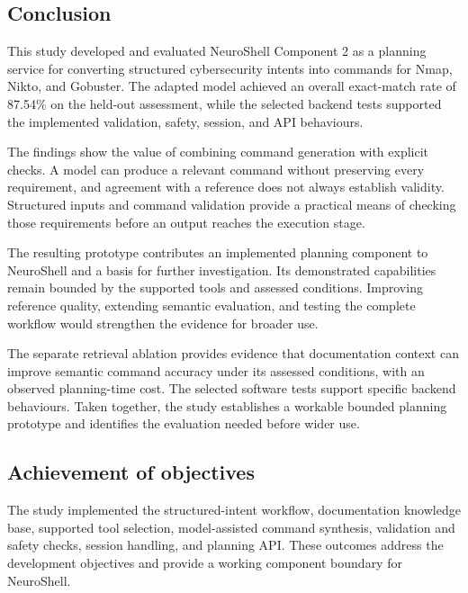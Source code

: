 \documentclass[
]{article}
\begin{document}
\hypertarget{conclusion}{%
\subsection{\texorpdfstring{
Conclusion}{ Conclusion}}\label{conclusion}}

This study developed and evaluated NeuroShell Component 2 as a planning
service for converting structured cybersecurity intents into commands
for Nmap, Nikto, and Gobuster. The adapted model achieved an overall
exact-match rate of 87.54\% on the held-out assessment, while the
selected backend tests supported the implemented validation, safety,
session, and API behaviours.

The findings show the value of combining command generation with
explicit checks. A model can produce a relevant command without
preserving every requirement, and agreement with a reference does not
always establish validity. Structured inputs and command validation
provide a practical means of checking those requirements before an
output reaches the execution stage.

The resulting prototype contributes an implemented planning component to
NeuroShell and a basis for further investigation. Its demonstrated
capabilities remain bounded by the supported tools and assessed
conditions. Improving reference quality, extending semantic evaluation,
and testing the complete workflow would strengthen the evidence for
broader use.

The separate retrieval ablation provides evidence that documentation
context can improve semantic command accuracy under its assessed
conditions, with an observed planning-time cost. The selected software
tests support specific backend behaviours. Taken together, the study
establishes a workable bounded planning prototype and identifies the
evaluation needed before wider use.

\hypertarget{achievement-of-objectives}{%
\subsection{Achievement of objectives}\label{achievement-of-objectives}}

The study implemented the structured-intent workflow, documentation
knowledge base, supported tool selection, model-assisted command
synthesis, validation and safety checks, session handling, and planning
API. These outcomes address the development objectives and provide a
working component boundary for NeuroShell.
\end{document}

